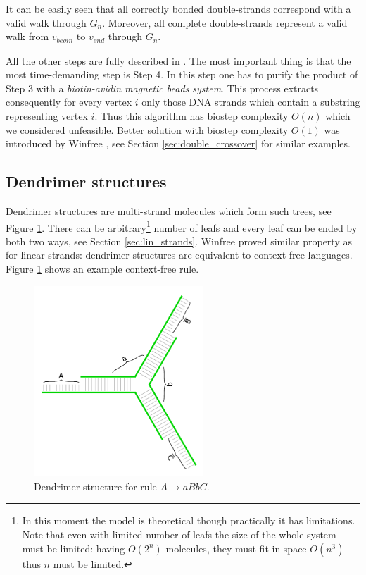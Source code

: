 		It can be easily seen that all correctly bonded double-strands correspond with a valid walk through $G_n$. Moreover, all complete double-strands represent a valid walk from $v_{begin}$ to $v_{end}$ through $G_n$.
		
		All the other steps are fully described in \cite{adleman94}. The most important thing is that the most time-demanding step is Step 4. In this step one has to purify the product of Step 3 with a {\em biotin-avidin magnetic beads system}. This process extracts consequently for every vertex $i$ only those DNA strands which contain a substring representing vertex $i$. Thus this algorithm has biostep complexity $O(n)$ which we considered unfeasible. Better solution with biostep complexity $O(1)$ was introduced by Winfree \cite{winfree_phd}, see Section \ref{sec:double_crossover} for similar examples.
	
	\subsection{Dendrimer structures}
	\label{sec:dendrimer}
		
		Dendrimer structures are multi-strand molecules which form such trees, see Figure \ref{fig:dendrimer}. There can be arbitrary\footnote{In this moment the model is theoretical though practically it has limitations. Note that even with limited number of leafs the size of the whole system must be limited: having $O(2^n)$ molecules, they must fit in space $O(n^3)$ thus $n$ must be limited.} number of leafs and every leaf can be ended by both two ways, see Section \ref{sec:lin_strands}. Winfree \cite{winfree_phd} proved similar property as for linear strands: dendrimer structures are equivalent to context-free languages. Figure \ref{fig:dendrimer} shows an example context-free rule.
		
		\begin{figure}[H]
		\begin{center}
			\includegraphics[width=0.568\textwidth]{./figures/strand_types/dendrimer.pdf}
			\caption{Dendrimer structure for rule $A\rightarrow aBbC$.}
			\label{fig:dendrimer}
		\end{center}
		\end{figure}
	
